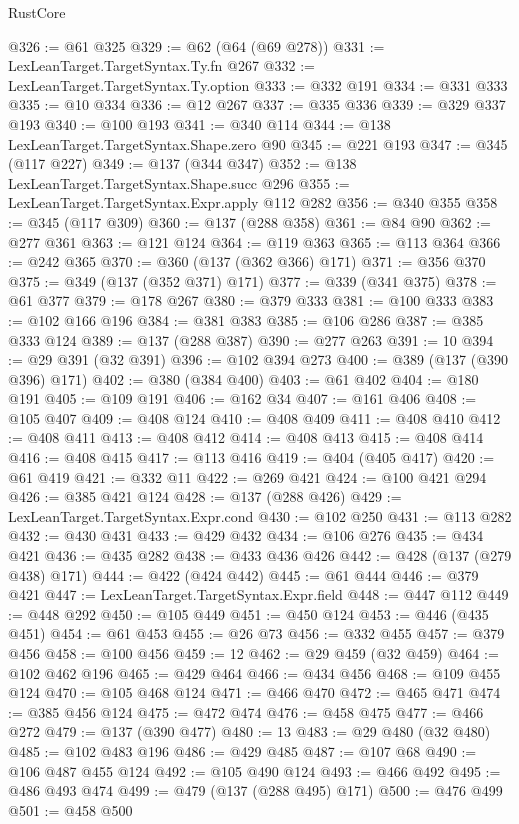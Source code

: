 \begin{lexlean}{RustCore}
\begin{coremodule}
{\begin{coremodule}
{{{{{{{{{{{{{{{{{{{{{{{{{{{{{{{{{{{{{{{{{{{{{@326 := @61 @325
@329 := @62 (@64 (@69 @278))
@331 := LexLeanTarget.TargetSyntax.Ty.fn @267
@332 := LexLeanTarget.TargetSyntax.Ty.option
@333 := @332 @191
@334 := @331 @333
@335 := @10 @334
@336 := @12 @267
@337 := @335 @336
@339 := @329 @337 @193
@340 := @100 @193
@341 := @340 @114
@344 := @138 LexLeanTarget.TargetSyntax.Shape.zero @90
@345 := @221 @193
@347 := @345 (@117 @227)
@349 := @137 (@344 @347)
@352 := @138 LexLeanTarget.TargetSyntax.Shape.succ @296
@355 := LexLeanTarget.TargetSyntax.Expr.apply @112 @282
@356 := @340 @355
@358 := @345 (@117 @309)
@360 := @137 (@288 @358)
@361 := @84 @90
@362 := @277 @361
@363 := @121 @124
@364 := @119 @363
@365 := @113 @364
@366 := @242 @365
@370 := @360 (@137 (@362 @366) @171)
@371 := @356 @370
@375 := @349 (@137 (@352 @371) @171)
@377 := @339 (@341 @375)
@378 := @61 @377
@379 := @178 @267
@380 := @379 @333
@381 := @100 @333
@383 := @102 @166 @196
@384 := @381 @383
@385 := @106 @286
@387 := @385 @333 @124
@389 := @137 (@288 @387)
@390 := @277 @263
@391 := 10
@394 := @29 @391 (@32 @391)
@396 := @102 @394 @273
@400 := @389 (@137 (@390 @396) @171)
@402 := @380 (@384 @400)
@403 := @61 @402
@404 := @180 @191
@405 := @109 @191
@406 := @162 @34
@407 := @161 @406
@408 := @105 @407
@409 := @408 @124
@410 := @408 @409
@411 := @408 @410
@412 := @408 @411
@413 := @408 @412
@414 := @408 @413
@415 := @408 @414
@416 := @408 @415
@417 := @113 @416
@419 := @404 (@405 @417)
@420 := @61 @419
@421 := @332 @11
@422 := @269 @421
@424 := @100 @421 @294
@426 := @385 @421 @124
@428 := @137 (@288 @426)
@429 := LexLeanTarget.TargetSyntax.Expr.cond
@430 := @102 @250
@431 := @113 @282
@432 := @430 @431
@433 := @429 @432
@434 := @106 @276
@435 := @434 @421
@436 := @435 @282
@438 := @433 @436 @426
@442 := @428 (@137 (@279 @438) @171)
@444 := @422 (@424 @442)
@445 := @61 @444
@446 := @379 @421
@447 := LexLeanTarget.TargetSyntax.Expr.field
@448 := @447 @112
@449 := @448 @292
@450 := @105 @449
@451 := @450 @124
@453 := @446 (@435 @451)
@454 := @61 @453
@455 := @26 @73
@456 := @332 @455
@457 := @379 @456
@458 := @100 @456
@459 := 12
@462 := @29 @459 (@32 @459)
@464 := @102 @462 @196
@465 := @429 @464
@466 := @434 @456
@468 := @109 @455 @124
@470 := @105 @468 @124
@471 := @466 @470
@472 := @465 @471
@474 := @385 @456 @124
@475 := @472 @474
@476 := @458 @475
@477 := @466 @272
@479 := @137 (@390 @477)
@480 := 13
@483 := @29 @480 (@32 @480)
@485 := @102 @483 @196
@486 := @429 @485
@487 := @107 @68
@490 := @106 @487 @455 @124
@492 := @105 @490 @124
@493 := @466 @492
@495 := @486 @493 @474
@499 := @479 (@137 (@288 @495) @171)
@500 := @476 @499
@501 := @458 @500
}}}}}}}}}}}}}}}}}}}}}}}}}}}}}}}}}}}}}}}}}}}}}
\end{coremodule}}
\end{coremodule}
\end{lexlean}
